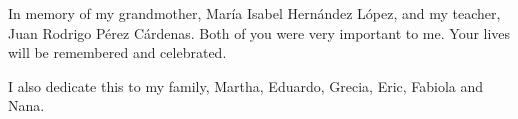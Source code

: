 \begin{dedication}

In memory of my grandmother, Mar\'ia Isabel Hern\'andez L\'opez, and my teacher, Juan Rodrigo P\'erez C\'ardenas. Both of you were very important to me. Your lives will be remembered and celebrated.

I also dedicate this to my family, Martha, Eduardo, Grecia, Eric, Fabiola and Nana.

\newpage

\end{dedication}
